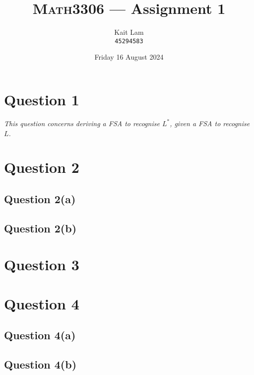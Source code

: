 \documentclass[a4paper]{article}
\author{Kait Lam \\ \small \texttt{45294583}}
\title{\textsc{Math3306} --- Assignment 1}
\date{Friday 16 August 2024}
\begin{document}
\maketitle


\section*{Question 1}
\begin{center}
  \textit{This question concerns deriving a FSA to recognise $L^*$, given a FSA to recognise $L$.}
\end{center}

\section*{Question 2}
\subsection*{Question 2(a)}
\subsection*{Question 2(b)}
\section*{Question 3}
\section*{Question 4}
\subsection*{Question 4(a)}
\subsection*{Question 4(b)}
\end{document}
